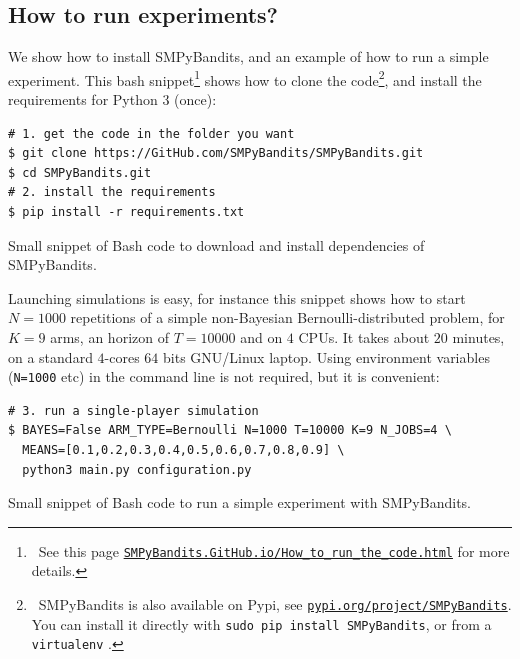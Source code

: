 \subsection{How to run experiments?}

We show how to install SMPyBandits, and an example of how to run a simple experiment.
This bash snippet\footnote{~See this page \texttt{\href{https://SMPyBandits.GitHub.io/How_to_run_the_code.html}{SMPyBandits.GitHub.io/How\_to\_run\_the\_code.html}} for more details.} shows how to clone the code\footnote{~SMPyBandits is also available on Pypi, see \texttt{\href{https://pypi.org/project/SMPyBandits/}{pypi.org/project/SMPyBandits}}. You can install it directly with \texttt{sudo pip install SMPyBandits}, or from a \texttt{virtualenv} \cite{virtualenv}.},
and install the requirements for Python 3 (once):

\begin{small}
    \begin{listing}[h!]
        \begin{verbatim}
# 1. get the code in the folder you want
$ git clone https://GitHub.com/SMPyBandits/SMPyBandits.git
$ cd SMPyBandits.git
# 2. install the requirements
$ pip install -r requirements.txt
        \end{verbatim}
        \caption{Small snippet of Bash code to download and install dependencies of SMPyBandits.}
        \label{lst:3:howToInstallLibrary}
    \end{listing}
\end{small}

Launching simulations is easy, for instance this snippet shows how to start $N=1000$ repetitions of a simple non-Bayesian Bernoulli-distributed problem, for $K=9$ arms, an horizon of $T=10000$ and on $4$ CPUs.
It takes about $20$ minutes, on a standard $4$-cores $64$ bits GNU/Linux laptop.
Using environment variables (\texttt{N=1000} etc) in the command line is not required, but it is convenient:

\begin{small}
\begin{listing}[h!]
    \begin{verbatim}
# 3. run a single-player simulation
$ BAYES=False ARM_TYPE=Bernoulli N=1000 T=10000 K=9 N_JOBS=4 \
  MEANS=[0.1,0.2,0.3,0.4,0.5,0.6,0.7,0.8,0.9] \
  python3 main.py configuration.py
    \end{verbatim}
    \caption{Small snippet of Bash code to run a simple experiment with SMPyBandits.}
    \label{lst:3:howToRunBasicLibrary}
\end{listing}
\end{small}



